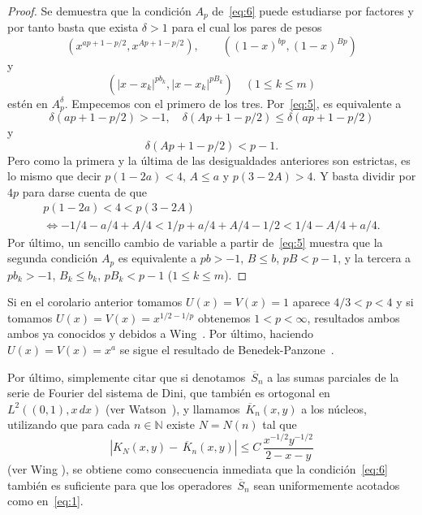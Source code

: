 \documentclass[a4paper]{article}
\newcommand{\N}{\mathbb{N}}
\begin{document}
\begin{proof}
Se demuestra que la condici\'on $A_p$ de~\eqref{eq:6} puede
estudiarse por factores y por tanto basta que exista 
$\delta > 1$ para el cual los pares de pesos
\begin{equation*}
  (x^{ap+1-p/2},x^{Ap+1-p/2}),\qquad ((1-x)^{bp},(1-x)^{Bp})
\end{equation*}
y
\begin{equation*}
  \left( |x-x_{k}|^{pb_k},|x-x_{k}|^{pB_k} \right) 
  \quad(1 \leq k \leq m)
\end{equation*}
est\'en en $A_p^{\delta}$. Empecemos con el primero 
de los tres. Por~\eqref{eq:5}, es equivalente a
\begin{equation*}
  \delta(ap + 1 - p/2) > -1,
  \quad \delta(Ap + 1 - p/2) \leq \delta(ap + 1 - p/2)
\end{equation*}
y
\begin{equation*}
  \delta(Ap + 1 - p/2) < p - 1.
\end{equation*}
Pero como la primera y la \'ultima de las desigualdades anteriores 
son estrictas, es lo mismo que decir $p(1-2a) < 4$, $A \leq a$ y
$p(3-2A) > 4$. Y basta dividir por $4p$ para darse cuenta 
de que
\begin{multline*}
  p(1-2a) < 4 < p(3-2A) \\
  \iff -1/4 - a/4 + A/4 < 1/p + a/4 + A/4 - 1/2 < 1/4 - A/4 + a/4.
\end{multline*}
Por \'ultimo, un sencillo cambio de variable a partir de~\eqref{eq:5} 
muestra que la segunda condici\'on $A_p$ es equivalente a $pb > -1$,
$B \leq b$, $pB < p-1$, y la tercera a $pb_{k} > -1$,
$B_{k} \leq b_{k}$, $pB_{k} < p-1$ ($1 \leq k \leq m$).
\end{proof}

Si en el corolario anterior tomamos $U(x) = V(x) = 1$ aparece
$4/3 < p < 4$ y si tomamos $U(x) = V(x) = x^{1/2-1/p}$ obtenemos 
$1 < p < \infty$, resultados ambos ambos ya conocidos 
y debidos a Wing~\cite{Wi}. Por \'ultimo, haciendo $U(x) = V(x) = x^{a}$ 
se sigue el resultado de Benedek-Panzone~\cite{BePa}.

Por \'ultimo, simplemente citar que si denotamos $\,\overline{\!S}_n$ a 
las sumas parciales de la serie de Fourier del sistema de Dini, 
que tambi\'en es ortogonal en $L^2((0,1),x\,dx)$ (ver Watson~\cite{Wa}), 
y llamamos $\,\overline{\!K}_n(x,y)$ a los n\'ucleos, utilizando que para 
cada $n \in \N$ existe $N = N(n)$ tal que
\begin{equation*}
  \left| K_{N}(x,y) - \,\overline{\!K}_n(x,y) \right|
  \leq C \,\frac{x^{-1/2}y^{-1/2}}{2-x-y}
\end{equation*}
(ver Wing \cite{Wi}), se obtiene como consecuencia inmediata que la 
condici\'on~\eqref{eq:6} tambi\'en es suficiente para que los operadores 
$\,\overline{\!S}_n$ sean uniformemente acotados como en~\eqref{eq:1}.
\end{document}
